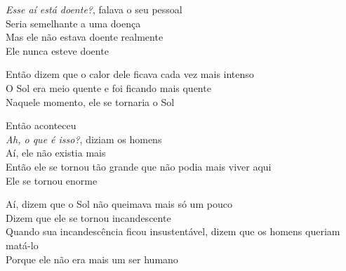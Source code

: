 \bigskip

\begin{linenumbers}\begingroup\raggedright
\noindent \textit{Esse aí está doente?}, falava o seu pessoal\\
Seria semelhante a uma doença\\
Mas ele não estava doente realmente\\
Ele nunca esteve doente
\end{linenumbers}\endgroup

\bigskip

\begin{linenumbers}\begingroup\raggedright
\noindent Então dizem que o calor dele ficava cada vez mais intenso\\
O Sol era meio quente e foi ficando mais quente\\
Naquele momento, ele se tornaria o Sol
\end{linenumbers}\endgroup

\bigskip

\begin{linenumbers}\begingroup\raggedright
\noindent Então aconteceu\\
\textit{Ah, o que é isso?}, diziam os homens\\
Aí, ele não existia mais\\
Então ele se tornou tão grande que não podia mais viver aqui\\
Ele se tornou enorme
\end{linenumbers}\endgroup

\bigskip

\begin{linenumbers}\begingroup\raggedright
\noindent Aí, dizem que o Sol não queimava mais só um pouco\\
Dizem que ele se tornou incandescente\\
Quando sua incandescência ficou insustentável, dizem que os homens
queriam matá-lo\\
Porque ele não era mais um ser humano
\end{linenumbers}\endgroup

